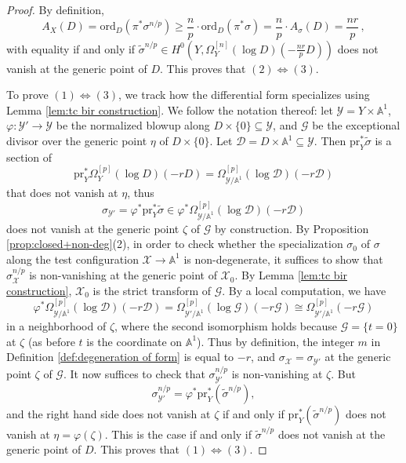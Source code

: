 \documentclass[12pt]{amsart}
\theoremstyle{definition}
\newcommand{\bA}{\mathbb{A}}
\newcommand{\scX}{\mathscr{X}}
\newcommand{\scY}{\mathscr{Y}}
\newcommand{\scD}{\mathscr{D}}
\newcommand{\scG}{\mathscr{G}}
\newcommand{\ord}{\mathrm{ord}}
\numberwithin{equation}{section}
\begin{document}
\begin{proof}
By definition, 
\[
A_X(D)=\ord_D(\pi^*\sigma^{n/p})\ge \frac{n}{p}\cdot \ord_D(\pi^*\sigma) = \frac{n}{p}\cdot A_\sigma (D) = \frac{nr}{p}\, ,
\]
with equality if and only if $\tilde{\sigma}^{n/p} \in H^0(Y,\Omega^{[n]}_{Y}(\log D)(-\frac{nr}{p}D))$ does not vanish at the generic point of $D$. This proves that $(2)\Leftrightarrow (3)$.

To  prove $(1)\Leftrightarrow (3)$, we track how the differential form specializes using Lemma \ref{lem:tc bir construction}. We follow the notation thereof: let $\scY=Y\times \bA^1$, $\varphi\colon \scY'\to \scY$ be the normalized blowup along $D\times \{0\}\subseteq \scY$, and $\mathscr{G}$ be the exceptional divisor over the generic point $\eta$ of $D\times \{0\}$. Let $\scD=D\times \bA^1\subseteq \scY$. Then $\mathrm{pr}_Y^*\tilde{\sigma}$ is a section of 
\[
\mathrm{pr}_Y^*\Omega^{[p]}_{Y}(\log D)(-rD) = \Omega^{[p]}_{\scY/\bA^1}(\log \scD)(-r\scD)
\]
that does not vanish at $\eta$, thus
\[ %
\sigma_{\scY'} = \varphi^*\mathrm{pr}_Y^*\tilde{\sigma} \in \varphi^*\Omega^{[p]}_{\scY/\bA^1}(\log \scD)(-r\scD) %
\]
does not vanish at the generic point $\zeta$ of $\mathscr{G}$ by construction. By Proposition \ref{prop:closed+non-deg}(2), in order to check whether the specialization $\sigma_0$ of $\sigma$ along the test configuration $\scX\to \bA^1$ is non-degenerate, it suffices to show that $\sigma_{\scX}^{n/p}$ is non-vanishing at the generic point of $\scX_0$. By Lemma \ref{lem:tc bir construction}, $\scX_0$ is the strict transform of $\mathscr{G}$. By a local computation, we have %
\[
\varphi^*\Omega^{[p]}_{\scY/\bA^1}(\log \scD)(-r\scD) = \Omega^{[p]}_{\scY'/\bA^1}(\log \mathscr{G})(-r\mathscr{G}) \cong  \Omega^{[p]}_{\scY'/\bA^1}(-r\mathscr{G})
\]
in a neighborhood of $\zeta$, where the second isomorphism holds because $\scG=\{t=0\}$ at $\zeta$ (as before $t$ is the coordinate on $\bA^1$). Thus by definition, the integer $m$ in Definition \ref{def:degeneration of form} is equal to $-r$, and $\sigma_{\scX} = \sigma_{\scY'}$ at the generic point $\zeta$ of $\mathscr{G}$. It now suffices to check that $\sigma_{\scY'}^{n/p}$ is non-vanishing at $\zeta$. But
\[
\sigma_{\scY'}^{n/p} = \varphi^*\mathrm{pr}_Y^*(\tilde{\sigma}^{n/p}),
\]
and the right hand side does not vanish at $\zeta$ if and only if $\mathrm{pr}_Y^*(\tilde{\sigma}^{n/p})$ does not vanish at $\eta = \varphi(\zeta)$. This is the case if and only if $\tilde{\sigma}^{n/p}$ does not vanish at the generic point of $D$. This proves that $(1)\Leftrightarrow (3)$. 
\end{proof}
\end{document}
